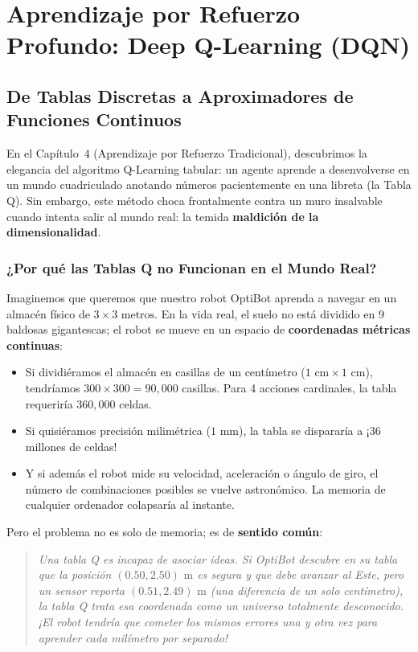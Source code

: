 \chapter{Aprendizaje por Refuerzo Profundo: Deep Q-Learning (DQN)}
\label{cap:deep_qlearning}
\label{cap:rl_profundo}
\label{cap:dqn}
\label{cap:proyecto_fronteras}

\section{De Tablas Discretas a Aproximadores de Funciones Continuos}
En el Capítulo~4 (Aprendizaje por Refuerzo Tradicional), descubrimos la elegancia del algoritmo Q-Learning tabular: un agente aprende a desenvolverse en un mundo cuadriculado anotando números pacientemente en una libreta (la Tabla Q). Sin embargo, este método choca frontalmente contra un muro insalvable cuando intenta salir al mundo real: la temida \textbf{maldición de la dimensionalidad}.

\subsection{¿Por qué las Tablas Q no Funcionan en el Mundo Real?}
Imaginemos que queremos que nuestro robot OptiBot aprenda a navegar en un almacén físico de $3 \times 3\text{ metros}$. En la vida real, el suelo no está dividido en 9 baldosas gigantescas; el robot se mueve en un espacio de \textbf{coordenadas métricas continuas}:
\begin{itemize}
  \item Si dividiéramos el almacén en casillas de un centímetro ($1\text{ cm} \times 1\text{ cm}$), tendríamos $300 \times 300 = 90{,}000$ casillas. Para 4 acciones cardinales, la tabla requeriría $360{,}000$ celdas.
  \item Si quisiéramos precisión milimétrica ($1\text{ mm}$), la tabla se dispararía a ¡$36$ millones de celdas!
  \item Y si además el robot mide su velocidad, aceleración o ángulo de giro, el número de combinaciones posibles se vuelve astronómico. La memoria de cualquier ordenador colapsaría al instante.
\end{itemize}

Pero el problema no es solo de memoria; es de \textbf{sentido común}:
\begin{quote}
  \textit{Una tabla Q es incapaz de asociar ideas. Si OptiBot descubre en su tabla que la posición $(0.50, 2.50)\text{ m}$ es segura y que debe avanzar al Este, pero un sensor reporta $(0.51, 2.49)\text{ m}$ (una diferencia de un solo centímetro), la tabla Q trata esa coordenada como un universo totalmente desconocido. ¡El robot tendría que cometer los mismos errores una y otra vez para aprender cada milímetro por separado!}
\end{quote}

